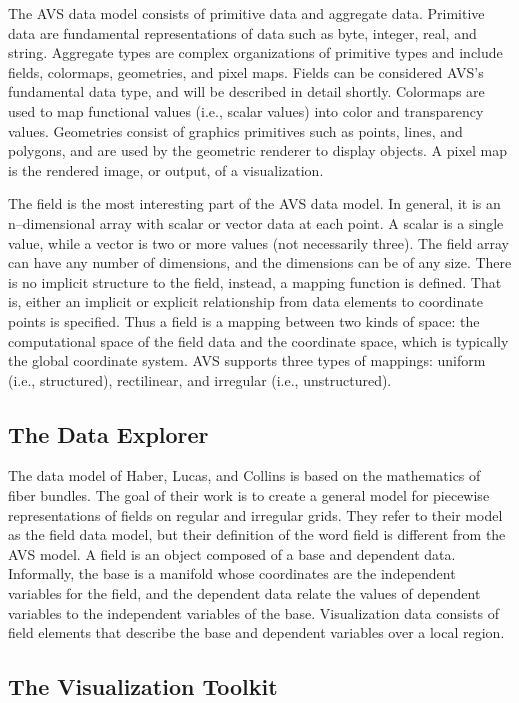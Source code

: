 The AVS data model consists of primitive data and aggregate data. Primitive data are fundamental representations of data such as byte, integer, real, and string. Aggregate types are complex organizations of primitive types and include fields, colormaps, geometries, and pixel maps. Fields can be considered AVS's fundamental data type, and will be described in detail shortly. Colormaps are used to map functional values (i.e., scalar values) into color and transparency values. Geometries consist of graphics primitives such as points, lines, and polygons, and are used by the geometric renderer to display objects. A pixel map is the rendered image, or output, of a visualization.

The field is the most interesting part of the AVS data model. In general, it is an n--dimensional array with scalar or vector data at each point. A scalar is a single value, while a vector is two or more values (not necessarily three). The field array can have any number of dimensions, and the dimensions can be of any size. There is no implicit structure to the field, instead, a mapping function is defined. That is, either an implicit or explicit relationship from data elements to coordinate points is specified. Thus a field is a mapping between two kinds of space: the computational space of the field data and the coordinate space, which is typically the global coordinate system. AVS supports three types of mappings: uniform (i.e., structured), rectilinear, and irregular (i.e., unstructured).

\subsection{The Data Explorer}

The data model of Haber, Lucas, and Collins \cite{Haber91} is based on the mathematics of fiber bundles. The goal of their work is to create a general model for piecewise representations of fields on regular and irregular grids. They refer to their model as the field data model, but their definition of the word field is different from the AVS model. A field is an object composed of a base and dependent data. Informally, the base is a manifold whose coordinates are the independent variables for the field, and the dependent data relate the values of dependent variables to the independent variables of the base. Visualization data consists of field elements that describe the base and dependent variables over a local region.

\subsection{The Visualization Toolkit}

